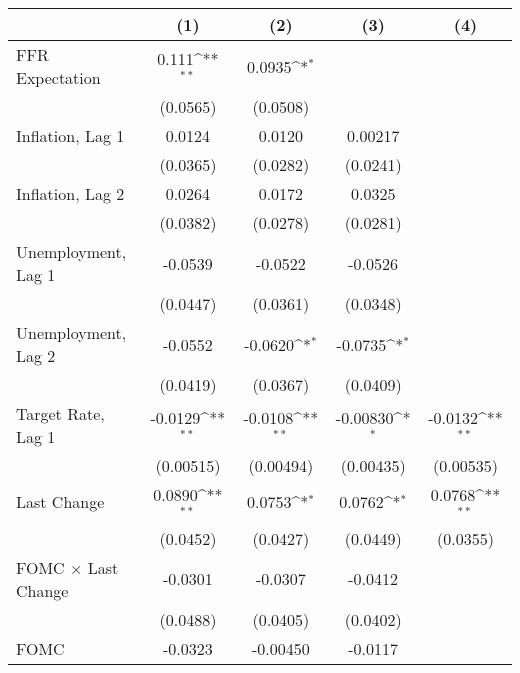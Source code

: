 {
\def\sym#1{\ifmmode^{#1}\else\(^{#1}\)\fi}
\begin{tabular}{l*{4}{c}}
\toprule
                &\multicolumn{1}{c}{(1)}         &\multicolumn{1}{c}{(2)}         &\multicolumn{1}{c}{(3)}         &\multicolumn{1}{c}{(4)}         \\
\midrule
FFR Expectation &    0.111\sym{**} &   0.0935\sym{*}  &                  &                  \\
                & (0.0565)         & (0.0508)         &                  &                  \\
Inflation, Lag 1&   0.0124         &   0.0120         &  0.00217         &                  \\
                & (0.0365)         & (0.0282)         & (0.0241)         &                  \\
Inflation, Lag 2&   0.0264         &   0.0172         &   0.0325         &                  \\
                & (0.0382)         & (0.0278)         & (0.0281)         &                  \\
Unemployment, Lag 1&  -0.0539         &  -0.0522         &  -0.0526         &                  \\
                & (0.0447)         & (0.0361)         & (0.0348)         &                  \\
Unemployment, Lag 2&  -0.0552         &  -0.0620\sym{*}  &  -0.0735\sym{*}  &                  \\
                & (0.0419)         & (0.0367)         & (0.0409)         &                  \\
Target Rate, Lag 1&  -0.0129\sym{**} &  -0.0108\sym{**} & -0.00830\sym{*}  &  -0.0132\sym{**} \\
                &(0.00515)         &(0.00494)         &(0.00435)         &(0.00535)         \\
Last Change     &   0.0890\sym{**} &   0.0753\sym{*}  &   0.0762\sym{*}  &   0.0768\sym{**} \\
                & (0.0452)         & (0.0427)         & (0.0449)         & (0.0355)         \\
FOMC $\times$ Last Change&  -0.0301         &  -0.0307         &  -0.0412         &                  \\
                & (0.0488)         & (0.0405)         & (0.0402)         &                  \\
FOMC            &  -0.0323         & -0.00450         &  -0.0117         &                  \\

\end{tabular}}
